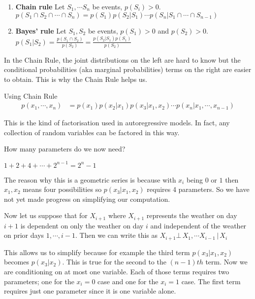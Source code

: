 \documentclass{article}
\begin{document}
\begin{enumerate}
    \item \textbf{Chain rule} Let $ S_{1}, \cdots S_{n} $ be events, $ p(S_{i}) > 0 $.
    \newline
    $ p(S_{1} \cap S_{2} \cap \cdots \cap S_{n}) = p(S_{1})p(S_{2} | S_{1}) \cdots p(S_{n} | S_{1} \cap \cdots \cap S_{n-1})  $
    \item \textbf{Bayes' rule} Let $ S_{1}, S_{2} $ be events, $ p(S_{1}) > 0 $ and $ p(S_{2}) > 0 $.
    \newline
    $ p (S_{1} | S_{2}) = \frac{p(S_{1} \cap S_{2})}{p(S_{2})} = \frac{p(S_{2} | S_{1})p(S_{1})}{p(S_{2})}$
\end{enumerate}

In the Chain Rule, the joint distributions on the left are hard to know but the conditional probabilities (aka marginal probabilities) terms on the right are easier to obtain.  This is why the Chain Rule helps us.

Using Chain Rule
\begin{align}
    p(x_{1}, \cdots , x_{n}) &= p(x_{1})p(x_{2} | x_{1})p(x_{3} | x_{1},x_{2}) \cdots p(x_{n} | x_{1}, \cdots , x_{n-1})
\end{align}

This is the kind of factorisation used in autoregressive models.
In fact, any collection of random variables can be factored in this way.

How many parameters do we now need?

$ 1 + 2 + 4 + \cdots + 2^{n-1} = 2^{n} - 1$

The reason why this is a geometric series is because with $ x_{i} $ being $0$ or $1$ then $ x_{1},x_{2} $ means four possibilities so $ p(x_{3} | x_{1}, x_{2}) $ requires 4 parameters. So we have not yet made progress on simplifying our computation.

Now let us suppose that for $ X_{i+1} $ where $X_{i+1}$ represents the weather on day $ i + 1 $ is dependent on only the weather on day $ i $ and independent of the weather on prior days $ 1, \cdots , i - 1 $.  Then we can write this as
$ X_{i+1} \bot \, X_{1}, \cdots X_{i-1} \, | \, X_{i} $

This allows us to simplify because for example the third term 
$ p(x_{3} | x_{1}, x_{2}) $ becomes $ p(x_{3} | x_{2}) $.
This is true for the second to the $ (n - 1) th$ term.  
Now we are conditioning on at most one variable.
Each of those terms requires two parameters; one for the $ x_{i} = 0 $ case and one for the $ x_{i} = 1 $ case.
The first term requires just one parameter since it is one variable alone.
\end{document}
